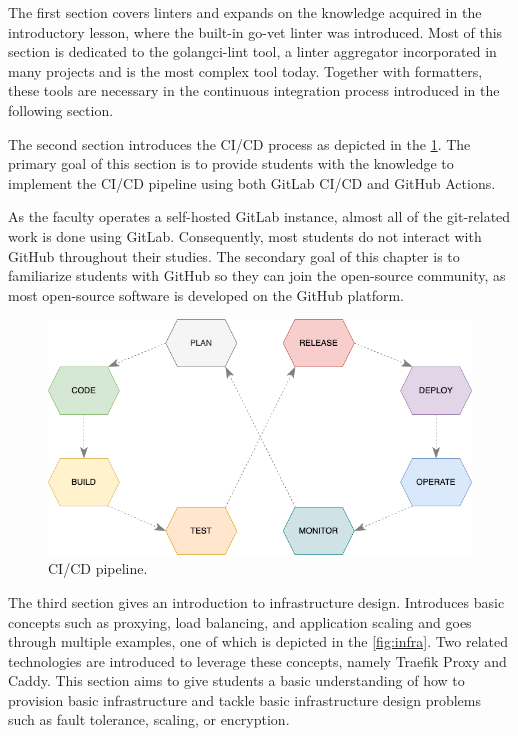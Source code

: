 \documentclass[
  digital,
  color,
  oneside,
  nosansbold,
  nocolorbold,
  nolof,
  nolot,
]{fithesis4}
\begin{document}
The first section covers linters and expands on the knowledge acquired in the introductory lesson, where the built-in go-vet linter was introduced. Most of this section is dedicated to the golangci-lint tool, a linter aggregator incorporated in many projects and is the most complex tool today. Together with formatters, these tools are necessary in the continuous integration process introduced in the following section.

The second section introduces the CI/CD process as depicted in the \cref{fig:cicd}. The primary goal of this section is to provide students with the knowledge to implement the CI/CD pipeline using both GitLab CI/CD\cite{gitlab-cicd} and GitHub Actions\cite{github-actions}.

As the faculty operates a self-hosted GitLab instance, almost all of the git-related work is done using GitLab. Consequently, most students do not interact with GitHub throughout their studies. The secondary goal of this chapter is to familiarize students with GitHub so they can join the open-source community, as most open-source software is developed on the GitHub platform.

\begin{figure}[H]
    \centering
    \includegraphics[width=12cm]{figures/cicd.png}
    \caption{CI/CD pipeline.}
    \label{fig:cicd}
\end{figure}

The third section gives an introduction to infrastructure design. Introduces basic concepts such as proxying, load balancing, and application scaling and goes through multiple examples, one of which is depicted in the \cref{fig:infra}. Two related technologies are introduced to leverage these concepts, namely Traefik Proxy\cite{traefik} and Caddy\cite{caddy}. This section aims to give students a basic understanding of how to provision basic infrastructure and tackle basic infrastructure design problems such as fault tolerance, scaling, or encryption.
\end{document}
